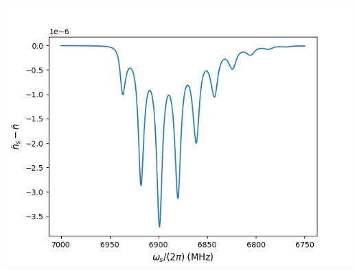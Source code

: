 \documentclass[xcolor=dvipsnames,hyperref={CJKbookmarks=true}]{beamer}
\begin{document}
\begin{frame}[t]
\begin{itemize}
\begin{columns}
\begin{column}{0.5\linewidth}
    \includegraphics[width=\linewidth]{nbar_2.png}
\end{column}
\end{columns}
\end{itemize}
\end{frame}
\end{document}
